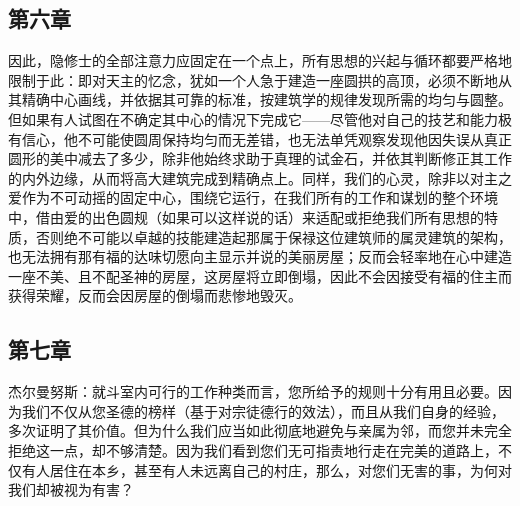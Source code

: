 
\subsection{第六章}

\par

因此，隐修士的全部注意力应固定在一个点上，所有思想的兴起与循环都要严格地限制于此：即对天主的忆念，犹如一个人急于建造一座圆拱的高顶，必须不断地从其精确中心画线，并依据其可靠的标准，按建筑学的规律发现所需的均匀与圆整。但如果有人试图在不确定其中心的情况下完成它——尽管他对自己的技艺和能力极有信心，他不可能使圆周保持均匀而无差错，也无法单凭观察发现他因失误从真正圆形的美中减去了多少，除非他始终求助于真理的试金石，并依其判断修正其工作的内外边缘，从而将高大建筑完成到精确点上。同样，我们的心灵，除非以对主之爱作为不可动摇的固定中心，围绕它运行，在我们所有的工作和谋划的整个环境中，借由爱的出色圆规（如果可以这样说的话）来适配或拒绝我们所有思想的特质，否则绝不可能以卓越的技能建造起那属于保禄这位建筑师的属灵建筑的架构，也无法拥有那有福的达味切愿向主显示并说的美丽房屋；反而会轻率地在心中建造一座不美、且不配圣神的房屋，这房屋将立即倒塌，因此不会因接受有福的住主而获得荣耀，反而会因房屋的倒塌而悲惨地毁灭。\par


\subsection{第七章}

\par

杰尔曼努斯：就斗室内可行的工作种类而言，您所给予的规则十分有用且必要。因为我们不仅从您圣德的榜样（基于对宗徒德行的效法），而且从我们自身的经验，多次证明了其价值。但为什么我们应当如此彻底地避免与亲属为邻，而您并未完全拒绝这一点，却不够清楚。因为我们看到您们无可指责地行走在完美的道路上，不仅有人居住在本乡，甚至有人未远离自己的村庄，那么，对您们无害的事，为何对我们却被视为有害？\par


